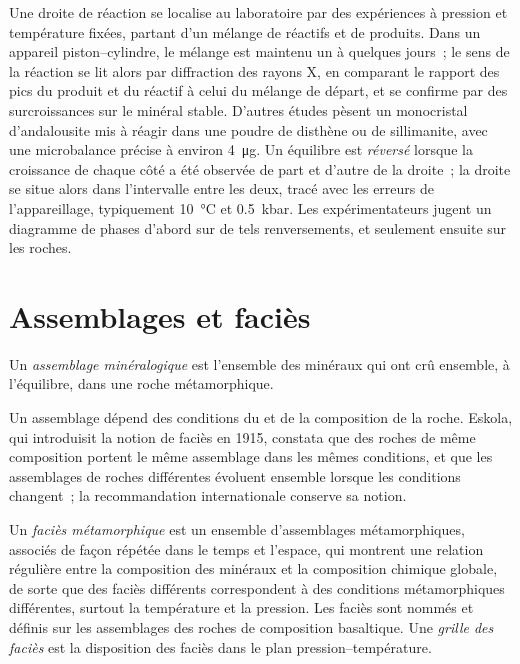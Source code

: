 \begin{inthelab}
Une droite de réaction se localise au laboratoire par des expériences à pression et température fixées,
partant d'un mélange de réactifs et de produits. Dans un appareil piston--cylindre, le mélange est
maintenu un à quelques jours~; le sens de la réaction se lit alors par diffraction des rayons X,
en comparant le rapport des pics du produit et du réactif à celui du mélange de départ, et se confirme
par des surcroissances sur le minéral stable. D'autres études pèsent un monocristal d'andalousite
mis à réagir dans une poudre de disthène ou de sillimanite, avec une microbalance précise à environ
\qty{4}{\micro g}. Un équilibre est \emph{réversé} lorsque la croissance de chaque côté a été observée
de part et d'autre de la droite~; la droite se situe alors dans l'intervalle entre les deux, tracé avec
les erreurs de l'appareillage, typiquement \qty{10}{\celsius} et \qty{0.5}{kbar}.
Les expérimentateurs jugent un diagramme de phases d'abord sur de tels renversements,
et seulement ensuite sur les roches.
\end{inthelab}

\section{Assemblages et faciès}\label{sec:b2:metamorphic-facies:facies}

\begin{definition}\label{def:b2:metamorphic-facies:assemblage}
Un \emph{assemblage minéralogique} est l'ensemble des minéraux qui ont crû
ensemble, à l'équilibre, dans une roche métamorphique.
\end{definition}

Un assemblage dépend des conditions du  et de la composition de la
roche. Eskola, qui introduisit la notion de faciès en 1915, constata que des roches de même
composition portent le même assemblage dans les mêmes conditions, et que les
assemblages de roches différentes évoluent ensemble lorsque les conditions changent~; la
recommandation internationale conserve sa notion.

\begin{definition}\label{def:b2:metamorphic-facies:facies}
Un \emph{faciès métamorphique} est un ensemble d'assemblages métamorphiques,
associés de façon répétée dans le temps et l'espace, qui montrent une relation régulière entre la composition
des minéraux et la composition chimique globale, de sorte que des faciès différents correspondent
à des conditions métamorphiques différentes, surtout la température et la pression. Les
faciès sont nommés et définis sur les assemblages des roches de composition basaltique. Une
\emph{grille des faciès} est la disposition des faciès dans le
plan pression--température.
\end{definition}


